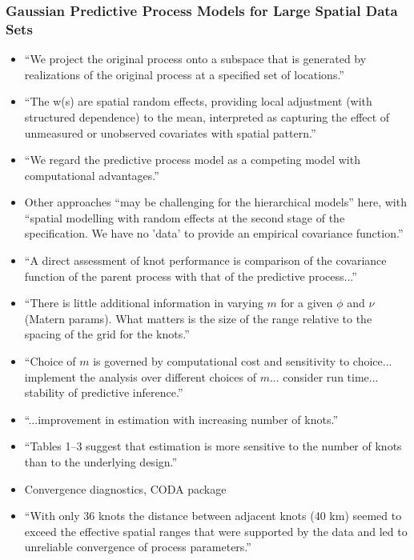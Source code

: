 \documentclass{article}
\begin{document}
\subsubsection{Gaussian Predictive Process Models for Large Spatial Data Sets}
\citep{Banerjee2008}
\begin{itemize}
\item ``We project the original process onto a subspace that is generated by realizations of the original process at a specified set of locations.''
\item ``The w(s) are spatial random effects, providing local adjustment (with structured dependence) to the mean, interpreted as capturing the effect of unmeasured or unobserved covariates with spatial pattern.''
\item ``We regard the predictive process model as a competing model with computational advantages.''
\item Other approaches ``may be challenging for the hierarchical models'' here, with ``spatial modelling with random effects at the second stage of the specification. We have no 'data' to provide an empirical covariance function.''
\item ``A direct assessment of knot performance is comparison of the covariance function of the parent process with that of the predictive process...''
\item ``There is little additional information in varying $m$ for a given $\phi$ and $\nu$ (Matern params). What matters is the size of the range relative to the spacing of the grid for the knots.''
\item ``Choice of $m$ is governed by computational cost and sensitivity to choice... implement the analysis over different choices of $m$... consider run time... stability of predictive inference.''
\item ``...improvement in estimation with increasing number of knots.''
\item ``Tables 1--3 suggest that estimation is more sensitive to the number of knots than to the underlying design.''
\item Convergence diagnostics, CODA package
\item ``With only 36 knots the distance between adjacent knots (40 km) seemed to exceed the effective spatial ranges that were supported by the data and led to unreliable convergence of process parameters.''
\end{itemize}

% 

\end{document}
